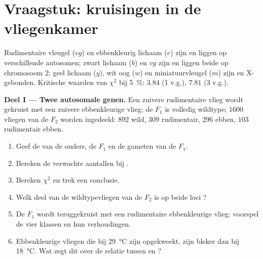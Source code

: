 \section{Vraagstuk: kruisingen in de vliegenkamer}

\begin{problem}
\label{pb:b2:meiosis-heredity:1}
Rudimentaire vleugel ($vg$) en ebbenkleurig lichaam ($e$) zijn 
en liggen op verschillende autosomen; zwart lichaam ($b$) en $vg$ zijn
 en liggen beide op chromosoom 2; geel lichaam ($y$), wit oog
($w$) en miniatuurvleugel ($m$) zijn  en X-gebonden. Kritische
waarden van $\chi^2$ bij
\qty{5}{\%}: $3.84$ (1 v.g.), $7.81$ (3 v.g.).

\medskip
\noindent\textbf{Deel I --- Twee autosomale genen.}
Een zuivere rudimentaire vlieg wordt gekruist met een zuivere ebbenkleurige
vlieg; de $F_1$ is volledig wildtype; $1600$ vliegen van de $F_2$ worden
ingedeeld: $892$ wild, $309$ rudimentair, $296$ ebben, $103$ rudimentair ebben.
\begin{enumerate}
  \item Geef de  van de ouders, de $F_1$ en de gameten
        van de $F_1$.
  \item Bereken de verwachte aantallen bij .
  \item Bereken $\chi^2$ en trek een conclusie.
  \item Welk deel van de wildtypevliegen van de $F_2$ is op
        beide loci ?
  \item De $F_1$ wordt teruggekruist met een rudimentaire ebbenkleurige vlieg:
        voorspel de vier klassen en hun verhoudingen.
  \item Ebbenkleurige vliegen die bij \qty{29}{\celsius} zijn opgekweekt, zijn
        bleker dan bij \qty{18}{\celsius}. Wat zegt dit over de relatie
        tussen  en ?
\end{enumerate}


\end{problem}
